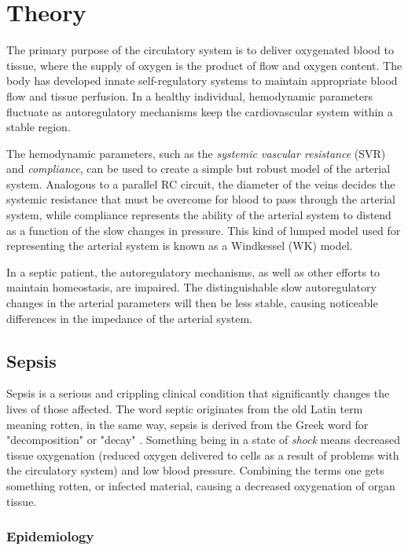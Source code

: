 
\chapter{Theory}

The primary purpose of the circulatory system is to deliver oxygenated blood to tissue, where the supply of oxygen is the product of flow and oxygen content\cite{RN11}. The body has developed innate self-regulatory systems to maintain appropriate blood flow and tissue perfusion. In a healthy individual, hemodynamic parameters fluctuate as autoregulatory mechanisms keep the cardiovascular system within a stable region.

The hemodynamic parameters, such as the \textit{systemic vascular resistance} (SVR) and \textit{compliance}, can be used to create a simple but robust model of the arterial system. Analogous to a parallel RC circuit, the diameter of the veins decides the systemic resistance that must be overcome for blood to pass through the arterial system, while compliance represents the ability of the arterial system to distend as a function of the slow changes in pressure. This kind of lumped model used for representing the arterial system is known as a Windkessel (WK) model.

In a septic patient, the autoregulatory mechanisms, as well as other efforts to maintain homeostasis, are impaired. The distinguishable slow autoregulatory changes in the arterial parameters will then be less stable, causing noticeable differences in the impedance of the arterial system.


\section{Sepsis}

Sepsis is a serious and crippling clinical condition that significantly changes the lives of those affected. The word septic originates from the old Latin term meaning rotten, in the same way, sepsis is derived from the Greek word for "decomposition" or "decay" \cite{RN3}. Something being in a state of \textit{shock} means decreased tissue oxygenation (reduced oxygen delivered to cells as a result of problems with the circulatory system) and low blood pressure. Combining the terms one gets something rotten, or infected material, causing a decreased oxygenation of organ tissue. 

\subsection{Epidemiology}

